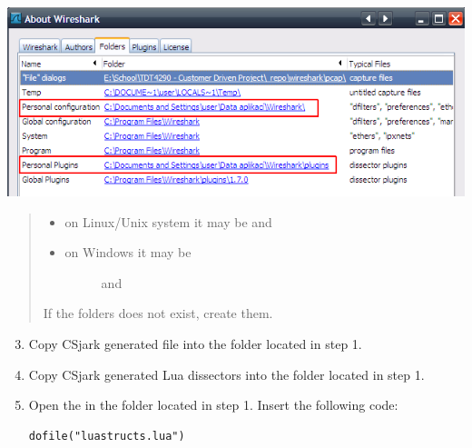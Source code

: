 \documentclass[A4paper,10pt,english]{sphinxmanual}
\begin{document}
{\hfill\includegraphics[width=\textwidth]{img/ws_about_folders.png}\hfill}
\begin{quote}
\begin{itemize}
\item {} 
on Linux/Unix system it may be   and  

\item {} \begin{description}
\item[{on Windows it may be }] \leavevmode
and 

\end{description}

\end{itemize}

If the folders does not exist, create them.
\end{quote}
\begin{enumerate}
\setcounter{enumi}{2}
\item {} 
Copy CSjark generated file  into the  folder located in step 1.

\item {} 
Copy CSjark generated Lua dissectors into the  folder located in step 1.

\item {} 
Open the  in the  folder located in step 1. Insert the following code:

\begin{Verbatim}[commandchars=\\\{\}]
dofile("luastructs.lua")
\end{Verbatim}

\end{enumerate}
\end{document}
